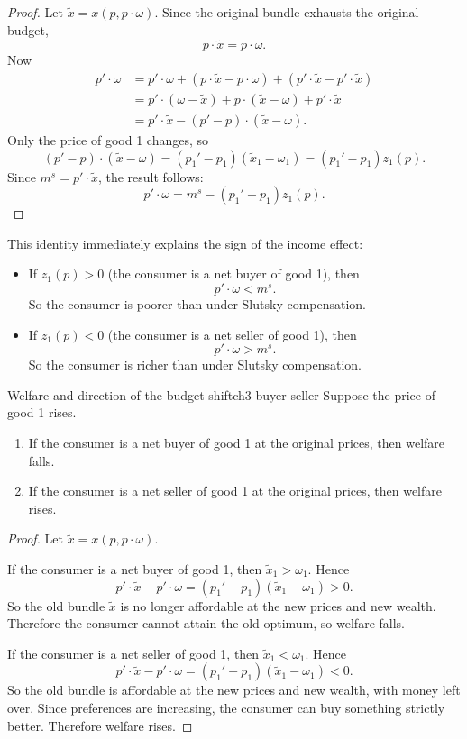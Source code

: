 \begin{proof}
Let $\tilde x = x(p,p\cdot \omega)$. Since the original bundle exhausts the original budget,
\[
p\cdot \tilde x = p\cdot \omega.
\]
Now
\begin{align*}
p'\cdot \omega
&= p'\cdot \omega + (p\cdot \tilde x - p\cdot \omega) + (p'\cdot \tilde x - p'\cdot \tilde x) \\
&= p'\cdot (\omega-\tilde x) + p\cdot (\tilde x-\omega) + p'\cdot \tilde x \\
&= p'\cdot \tilde x - (p'-p)\cdot(\tilde x-\omega).
\end{align*}
Only the price of good 1 changes, so
\[
(p'-p)\cdot(\tilde x-\omega)=(p_1'-p_1)(\tilde x_1-\omega_1)=(p_1'-p_1)z_1(p).
\]
Since $m^s=p'\cdot \tilde x$, the result follows:
\[
p'\cdot \omega = m^s-(p_1'-p_1)z_1(p).
\]
\end{proof}

This identity immediately explains the sign of the income effect:

\begin{itemize}
    \item If $z_1(p)>0$ (the consumer is a net buyer of good 1), then
    \[
    p'\cdot \omega < m^s.
    \]
    So the consumer is poorer than under Slutsky compensation.
    \item If $z_1(p)<0$ (the consumer is a net seller of good 1), then
    \[
    p'\cdot \omega > m^s.
    \]
    So the consumer is richer than under Slutsky compensation.
\end{itemize}

\begin{theorem}{Welfare and direction of the budget shift}{ch3-buyer-seller}
Suppose the price of good 1 rises.

\begin{enumerate}
    \item If the consumer is a net buyer of good 1 at the original prices, then welfare falls.
    \item If the consumer is a net seller of good 1 at the original prices, then welfare rises.
\end{enumerate}
\end{theorem}

\begin{proof}
Let $\tilde x=x(p,p\cdot \omega)$.

If the consumer is a net buyer of good 1, then $\tilde x_1>\omega_1$. Hence
\[
p'\cdot \tilde x - p'\cdot \omega = (p_1'-p_1)(\tilde x_1-\omega_1)>0.
\]
So the old bundle $\tilde x$ is no longer affordable at the new prices and new wealth. Therefore the consumer cannot attain the old optimum, so welfare falls.

If the consumer is a net seller of good 1, then $\tilde x_1<\omega_1$. Hence
\[
p'\cdot \tilde x - p'\cdot \omega = (p_1'-p_1)(\tilde x_1-\omega_1)<0.
\]
So the old bundle is affordable at the new prices and new wealth, with money left over. Since preferences are increasing, the consumer can buy something strictly better. Therefore welfare rises.
\end{proof}

